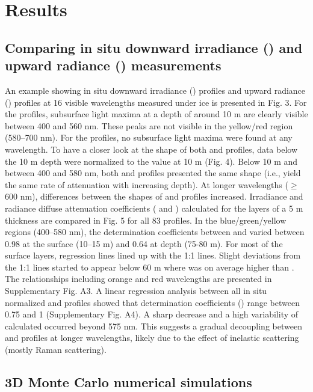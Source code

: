 \section{Results}

\subsection{Comparing in situ downward irradiance (\ed{}) and upward radiance (\lu{}) measurements}

An example showing in situ downward irradiance (\ed{}) profiles and upward radiance (\lu{}) profiles at 16 visible wavelengths measured under ice is presented in Fig. 3. For the \ed{} profiles, subsurface light maxima at a depth of around 10 m are clearly visible between 400 and 560 nm. These peaks are not visible in the yellow/red region (580--700 nm). For the \lu{} profiles, no subsurface light maxima were found at any wavelength. To have a closer look at the shape of both \ed{} and \lu{} profiles, data below the 10 m depth were normalized to the value at 10 m (Fig. 4). Below 10 m and between 400 and 580 nm, both \ed{} and \lu{} profiles presented the same shape (i.e., yield the same rate of attenuation with increasing depth). At longer wavelengths ($\ge$ 600 nm), differences between the shapes of \ed{} and \lu{} profiles increased. Irradiance and radiance diffuse attenuation coefficients (\ked{} and \klu{}) calculated for the layers of a 5 m thickness are compared in Fig. 5 for all 83 profiles. In the blue/green/yellow regions (400--580 nm), the determination coefficients between \klu{} and \ked{} varied between 0.98 at the surface (10--15 m) and 0.64 at depth (75-80 m). For most of the surface layers, regression lines lined up with the 1:1 lines. Slight deviations from the 1:1 lines started to appear below 60 m where \ked{} was on average higher than \klu{}. The relationships including orange and red wavelengths are presented in Supplementary Fig. A3. A linear regression analysis between all in situ normalized \ed{} and \lu{} profiles showed that determination coefficients (\rsquared{}) range between 0.75 and 1 (Supplementary Fig. A4). A sharp decrease and a high variability of calculated \rsquared{} occurred beyond 575 nm. This suggests a gradual decoupling between \ed{} and \lu{} profiles at longer wavelengths, likely due to the effect of inelastic scattering (mostly Raman scattering). 

\subsection{3D Monte Carlo numerical simulations}

